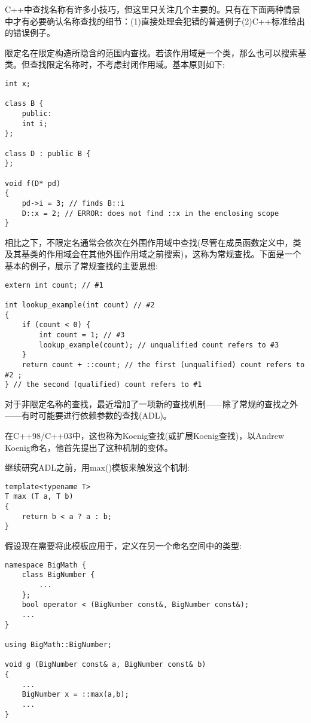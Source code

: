 
C++中查找名称有许多小技巧，但这里只关注几个主要的。只有在下面两种情景中才有必要确认名称查找的细节：(1)直接处理会犯错的普通例子(2)C++标准给出的错误例子。

限定名在限定构造所隐含的范围内查找。若该作用域是一个类，那么也可以搜索基类。但查找限定名称时，不考虑封闭作用域。基本原则如下:

\begin{lstlisting}[style=styleCXX]
int x;

class B {
	public:
	int i;
};

class D : public B {
};

void f(D* pd)
{
	pd->i = 3; // finds B::i
	D::x = 2; // ERROR: does not find ::x in the enclosing scope
}
\end{lstlisting}

相比之下，不限定名通常会依次在外围作用域中查找(尽管在成员函数定义中，类及其基类的作用域会在其他外围作用域之前搜索)，这称为常规查找。下面是一个基本的例子，展示了常规查找的主要思想:

\begin{lstlisting}[style=styleCXX]
extern int count; // #1

int lookup_example(int count) // #2
{
	if (count < 0) {
		int count = 1; // #3
		lookup_example(count); // unqualified count refers to #3
	}
	return count + ::count; // the first (unqualified) count refers to #2 ;
} // the second (qualified) count refers to #1
\end{lstlisting}

对于非限定名称的查找，最近增加了一项新的查找机制——除了常规的查找之外——有时可能要进行依赖参数的查找(ADL)。

\begin{tcolorbox}[colback=webgreen!5!white,colframe=webgreen!75!black]
\hspace*{0.75cm}在C++98/C++03中，这也称为Koenig查找(或扩展Koenig查找)，以Andrew Koenig命名，他首先提出了这种机制的变体。
\end{tcolorbox}

继续研究ADL之前，用max()模板来触发这个机制:

\begin{lstlisting}[style=styleCXX]
template<typename T>
T max (T a, T b)
{
	return b < a ? a : b;
}
\end{lstlisting}

假设现在需要将此模板应用于，定义在另一个命名空间中的类型:

\begin{lstlisting}[style=styleCXX]
namespace BigMath {
	class BigNumber {
		...
	};
	bool operator < (BigNumber const&, BigNumber const&);
	...
}

using BigMath::BigNumber;

void g (BigNumber const& a, BigNumber const& b)
{
	...
	BigNumber x = ::max(a,b);
	...
}
\end{lstlisting}

